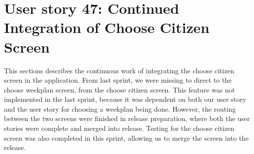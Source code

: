 \section{User story 47: Continued Integration of Choose Citizen Screen}
This sections describes the continuous work of integrating the choose citizen screen in the application. From last sprint, we were missing to direct to the choose weekplan screen, from the choose citizen screen. This feature was not implemented in the last sprint, because it was dependent on both our user story and the user story for choosing a weekplan being done. However, the routing between the two screens were finished in release preparation, where both the user stories were complete and merged into release. Testing for the choose citizen screen was also completed in this sprint, allowing us to merge the screen into the release.